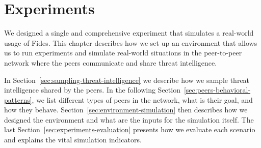 \chapter{Experiments}
\label{ch:experiments}
We designed a single and comprehensive experiment that simulates a real-world usage of Fides. This chapter describes how we set up an environment that allows us to run experiments and simulate real-world situations in the peer-to-peer network where the peers communicate and share threat intelligence.

In Section~\ref{sec:sampling-threat-intelligence} we describe how we sample threat intelligence shared by the peers.
In the following Section~\ref{sec:peers-behavioral-patterns}, we list different types of peers in the network, what is their goal, and how they behave.
Section~\ref{sec:environment-simulation} then describes how we designed the environment and what are the inputs for the simulation itself.
The last Section~\ref{sec:experiments-evaluation} presents how we evaluate each scenario and explains the vital simulation indicators.








